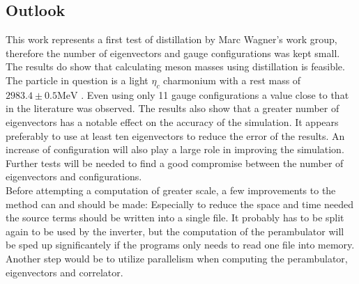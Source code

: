 \subsection{Outlook}

This work represents a first test of distillation by Marc Wagner's work group, therefore the number of eigenvectors and gauge configurations was kept small.\\
The results do show that calculating meson masses using distillation is feasible. The particle in question is a light $\eta_c$ charmonium with a rest mass of $2983.4 \pm 0.5 \text{MeV}$ \cite{pdglive}. Even using only 11 gauge configurations a value close to that in the literature was observed. The results also show that a greater number of eigenvectors has a notable effect on the accuracy of the simulation. It appears preferably to use at least ten eigenvectors to reduce the error of the results. An increase of configuration will also play a large role in improving the simulation. Further tests will be needed to find a good compromise between the number of eigenvectors and configurations.\\

Before attempting a computation of greater scale, a few improvements to the method can and should be made: Especially to reduce the space and time needed the source terms should be written into a single file. It probably has to be split again to be used by the inverter, but the computation of the perambulator will be sped up significantely if the programs only needs to read one file into memory. Another step would be to utilize parallelism when computing the perambulator, eigenvectors and correlator.